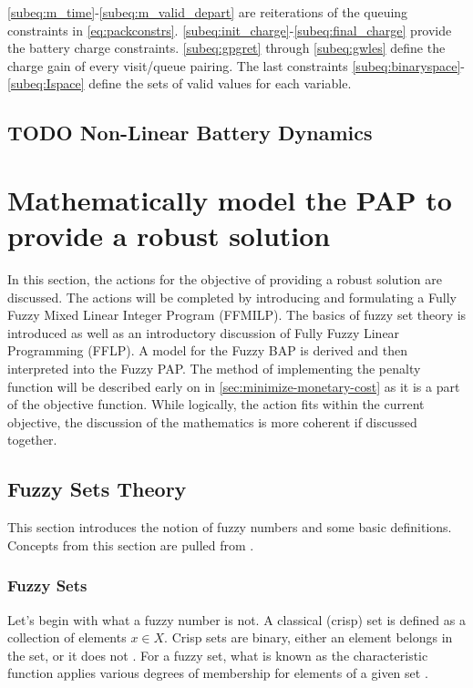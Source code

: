 \documentclass[ee,msthesis]{usuthesis}
\begin{document}
\autoref{subeq:m_time}-\autoref{subeq:m_valid_depart} are reiterations of the queuing constraints in
\autoref{eq:packconstrs}. \autoref{subeq:init_charge}-\autoref{subeq:final_charge} provide the battery charge
constraints. \autoref{subeq:gpgret} through \autoref{subeq:gwles} define the charge gain of every visit/queue
pairing. The last constraints \autoref{subeq:binaryspace}-\autoref{subeq:Ispace} define the sets of valid values for each
variable.

\subsection{{\bfseries\sffamily TODO} Non-Linear Battery Dynamics}
\label{sec:non-linear-battery-dynamics}

\section{Mathematically model the PAP to provide a robust solution}
\label{sec:math-model-robust}
In this section, the actions for the objective of providing a robust solution are discussed. The actions will be
completed by introducing and formulating a Fully Fuzzy Mixed Linear Integer Program (FFMILP). The basics of fuzzy set
theory is introduced as well as an introductory discussion of Fully Fuzzy Linear Programming (FFLP). A model for the
Fuzzy BAP is derived and then interpreted into the Fuzzy PAP. The method of implementing the penalty function will be
described early on in \ref{sec:minimize-monetary-cost} as it is a part of the objective function. While logically, the action
fits within the current objective, the discussion of the mathematics is more coherent if discussed together.

\subsection{Fuzzy Sets Theory}
\label{sec:fuzzy-sets-theory}
This section introduces the notion of fuzzy numbers and some basic definitions. Concepts from this section are pulled
from \cite{zimmermann-2001-fuzzy-set,das-2016-mathem-model,yaghobi-2014-compar-fuzzy,bello-2019-fuzzy-activ}.

\subsubsection{Fuzzy Sets}
\label{sec:orge87ad18}
Let's begin with what a fuzzy number is not. A classical (crisp) set is defined as a collection of elements \(x \in X\).
Crisp sets are binary, either an element belongs in the set, or it does not \cite{zimmermann-2001-fuzzy-set}. For a
fuzzy set, what is known as the characteristic function applies various degrees of membership for elements of a given
set \cite{zimmermann-2001-fuzzy-set}.
\end{document}
